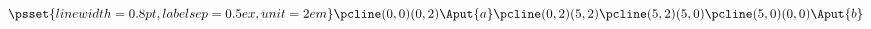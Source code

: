 

\nopagenumbers
$
\psset{linewidth=0.8pt,labelsep=0.5ex,unit=2em}
\pcline(0,0)(0,2)
\Aput{a}
\pcline(0,2)(5,2)
\pcline(5,2)(5,0)
\pcline(5,0)(0,0)
\Aput{b}
$
\bye
